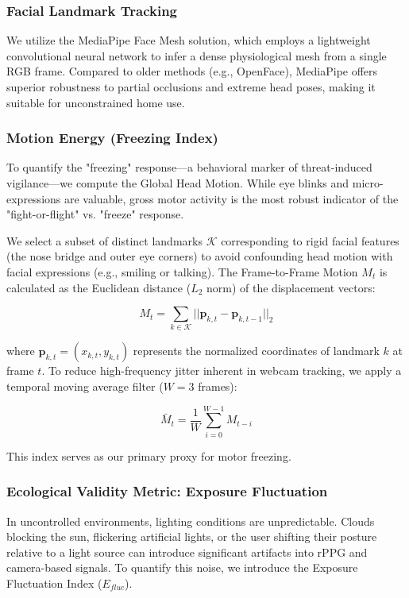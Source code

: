 \subsubsection{Facial Landmark Tracking}
We utilize the MediaPipe Face Mesh solution, which employs a lightweight convolutional neural network to infer a dense physiological mesh from a single RGB frame. Compared to older methods (e.g., OpenFace), MediaPipe offers superior robustness to partial occlusions and extreme head poses, making it suitable for unconstrained home use.

\subsubsection{Motion Energy (Freezing Index)}
To quantify the "freezing" response—a behavioral marker of threat-induced vigilance—we compute the Global Head Motion. While eye blinks and micro-expressions are valuable, gross motor activity is the most robust indicator of the "fight-or-flight" vs. "freeze" response.

We select a subset of distinct landmarks $\mathcal{K}$ corresponding to rigid facial features (the nose bridge and outer eye corners) to avoid confounding head motion with facial expressions (e.g., smiling or talking). The Frame-to-Frame Motion $M_t$ is calculated as the Euclidean distance ($L_2$ norm) of the displacement vectors:

\begin{equation}
M_t = \sum_{k \in \mathcal{K}} || \mathbf{p}_{k,t} - \mathbf{p}_{k,t-1} ||_2
\end{equation}

where $\mathbf{p}_{k,t} = (x_{k,t}, y_{k,t})$ represents the normalized coordinates of landmark $k$ at frame $t$. To reduce high-frequency jitter inherent in webcam tracking, we apply a temporal moving average filter ($W=3$ frames):

\begin{equation}
\bar{M}_t = \frac{1}{W} \sum_{i=0}^{W-1} M_{t-i}
\end{equation}

This index serves as our primary proxy for motor freezing.

\subsubsection{Ecological Validity Metric: Exposure Fluctuation}
In uncontrolled environments, lighting conditions are unpredictable. Clouds blocking the sun, flickering artificial lights, or the user shifting their posture relative to a light source can introduce significant artifacts into rPPG and camera-based signals. To quantify this noise, we introduce the Exposure Fluctuation Index ($E_{fluc}$).

